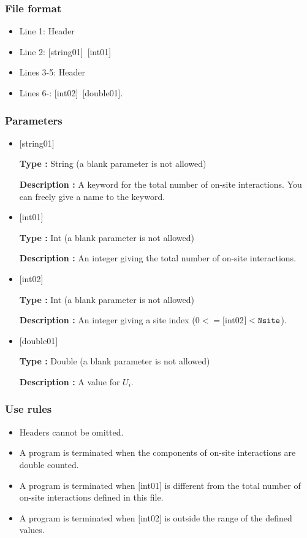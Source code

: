\subsubsection{File format}
 \begin{itemize}
   \item  Line 1:  Header
   \item  Line 2:   [string01]~[int01]
   \item  Lines 3-5:  Header
   \item  Lines 6-:  [int02]~[double01].
  \end{itemize}
\subsubsection{Parameters}
 \begin{itemize}

   \item  $[$string01$]$
   
    {\bf Type :} String (a blank parameter is not allowed)

   {\bf Description :} A keyword for the total number of on-site interactions. You can freely give a name to the keyword.

   \item  $[$int01$]$
   
    {\bf Type :} Int (a blank parameter is not allowed)

   {\bf Description :} An integer giving the total number of on-site interactions.

  \item  $[$int02$]$
  
 {\bf Type :} Int (a blank parameter is not allowed)

{\bf Description :} An integer giving a site index ($0<= [$int02$]<\verb|Nsite|$).
 
 \item  $[$double01$]$
   
   {\bf Type :} Double (a blank parameter is not allowed)

  {\bf Description :}  A value for $U_i$.

\end{itemize}

\subsubsection{Use rules}
\begin{itemize}
\item Headers cannot be omitted. 
\item A program is terminated when the components of on-site interactions are double counted.
\item A program is terminated when $[$int01$]$ is different from the total number of on-site interactions defined in this file.
\item A program is terminated when $[$int02$]$ is outside the range of the defined values.
\end{itemize}


